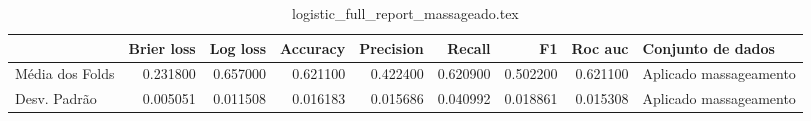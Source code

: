 \begin{table}
\centering
\caption{logistic_full_report_massageado.tex}
\label{logistic_full_report_massageado.tex}
\begin{tabular}{lrrrrrrrl}
\toprule
{} &  Brier  loss &  Log loss &  Accuracy  &  Precision  &   Recall  &       F1  &  Roc auc  &       Conjunto de dados \\
\midrule
Média dos Folds &     0.231800 &  0.657000 &   0.621100 &    0.422400 &  0.620900 &  0.502200 &  0.621100 &  Aplicado massageamento \\
Desv. Padrão    &     0.005051 &  0.011508 &   0.016183 &    0.015686 &  0.040992 &  0.018861 &  0.015308 &  Aplicado massageamento \\
\bottomrule
\end{tabular}
\end{table}
